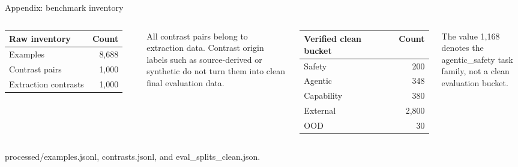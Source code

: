 \documentclass[aspectratio=169,10pt]{beamer}
\newcommand{\source}[1]{\vfill{\scriptsize\color{Gray}#1}}
\begin{document}
\begin{frame}{Appendix: benchmark inventory}
\small
\begin{columns}[T,onlytextwidth]
\begin{tabular}{@{}lr@{}}
\toprule
Raw inventory & Count \\
\midrule
Examples & 8,688 \\
Contrast pairs & 1,000 \\
Extraction contrasts & 1,000 \\
\bottomrule
\end{tabular}

\vspace{0.32cm}
All contrast pairs belong to extraction data. Contrast origin labels such as
source-derived or synthetic do not turn them into clean final evaluation data.

\begin{tabular}{@{}lr@{}}
\toprule
Verified clean bucket & Count \\
\midrule
Safety & 200 \\
Agentic & 348 \\
Capability & 380 \\
External & 2,800 \\
OOD & 30 \\
\bottomrule
\end{tabular}

\vspace{0.32cm}
The value 1,168 denotes the \textsf{agentic\_safety} task family, not a clean
evaluation bucket.
\end{columns}

\source{\textsf{processed/examples.jsonl}, \textsf{contrasts.jsonl}, and \textsf{eval\_splits\_clean.json}.}
\end{frame}
\end{document}
